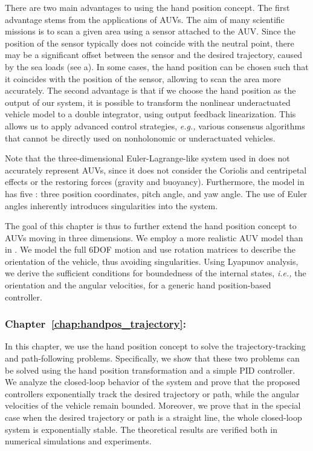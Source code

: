 There are two main advantages to using the hand position concept.
The first advantage stems from the applications of AUVs.
The aim of many scientific missions is to scan a given area using a sensor attached to the AUV.
Since the position of the sensor typically does not coincide with the neutral point, there may be a significant offset between the sensor and the desired trajectory, caused by the sea loads (see a).
In some cases, the hand position can be chosen such that it coincides with the position of the sensor, allowing to scan the area more accurately.
The second advantage is that if we choose the hand position as the output of our system, it is possible to transform the nonlinear underactuated vehicle model to a double integrator, using output feedback linearization.
This allows us to apply advanced control strategies, \emph{e.g.,} various consensus algorithms \cite{cai_hand-position-rigidity-planar_2015,li_hand-position-rigidity-3d_2021,lawton_hand-position-formation_2003,restrepo_formation_2022} that cannot be directly used on nonholonomic or underactuated vehicles.

Note that the three-dimensional Euler-Lagrange-like system used in \cite{li_hand-position-rigidity-3d_2021} does not accurately represent AUVs, since it does not consider the Coriolis and centripetal effects or the restoring forces (gravity and buoyancy).
Furthermore, the model in \cite{li_hand-position-rigidity-3d_2021} has five : three position coordinates, pitch angle, and yaw angle.
The use of Euler angles inherently introduces singularities into the system.

The goal of this chapter is thus to further extend the hand position concept to AUVs moving in three dimensions.
We employ a more realistic AUV model than in \cite{li_hand-position-rigidity-3d_2021}. We model the full 6DOF motion and use rotation matrices to describe the orientation of the vehicle, thus avoiding singularities.
Using Lyapunov analysis, we derive the sufficient conditions for boundedness of the internal states, \emph{i.e.,} the orientation and the angular velocities, for a generic hand position-based controller.

\subsubsection{Chapter~\ref{chap:handpos_trajectory}: }

In this chapter, we use the hand position concept to solve the trajectory-tracking and path-following problems.
Specifically, we show that these two problems can be solved using the hand position transformation and a simple PID controller.
We analyze the closed-loop behavior of the system and prove that the proposed controllers exponentially track the desired trajectory or path, while the angular velocities of the vehicle remain bounded.
Moreover, we prove that in the special case when the desired trajectory or path is a straight line, the whole closed-loop system is exponentially stable.
The theoretical results are verified both in numerical simulations and experiments.


